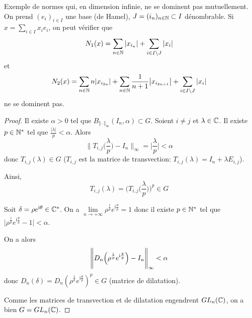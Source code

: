 \begin{remark}
	Exemple de normes qui, en dimension infinie, ne se dominent pas mutuellement. On prend $(e_{i})_{i\in I}$ une base (de Hamel), $J=(i_{n})_{n\in\mathbb{N}}\subset I$ dénombrable. Si $x=\sum_{i\in I}x_{i}e_{i}$, on peut vérifier que 
	\begin{equation}N_{1}(x)=\sum_{n\in\mathbb{N}}\vert x_{i_{n}}\vert+\sum_{i\in I\setminus J}\vert x_{i}\vert\end{equation}
	et
	\begin{equation}N_{2}(x)=\sum_{n\in\mathbb{N}}n\vert x_{i_{2n}}\vert+\sum_{n\in\mathbb{N}}\frac{1}{n+1}\bigl\lvert x_{i_{2n+1}}\bigr\rvert+\sum_{i\in I\setminus J}\vert x_{i}\vert\end{equation}
	ne se dominent pas.
\end{remark}

\begin{proof}
	Il existe $\alpha>0$ tel que $B_{\Vert\cdot\Vert_{\infty}}(I_{n},\alpha)\subset G$. Soient $i\neq j$ et $\lambda\in\mathbb{C}$. Il existe $p\in\mathbb{N}^{*}$ tel que $\frac{\vert\lambda\vert}{p}<\alpha$. Alors 
	\begin{equation}\Biggl\lVert T_{i,j}\Biggl(\frac{\lambda}{p}\Biggr)-I_{n}\Biggr\rVert_{\infty}=\Biggl\lvert\frac{\lambda}{p}\Biggr\rvert<\alpha\end{equation}
	donc $T_{i,j}(\lambda)\in G$ ($T_{i,j}$ est la matrice de transvection: $T_{i,j}(\lambda)=I_{n}+\lambda E_{i,j}$).

	Ainsi,
	\begin{equation}T_{i,j}(\lambda)=\Biggl(T_{i,j}\Biggl(\frac{\lambda}{p}\Biggr)\Biggr)^{p}\in G\end{equation}

	Soit $\delta=\rho e^{\mathrm{i}\theta}\in\mathbb{C}^{*}$. On a $\lim\limits_{n\to+\infty}\rho^{\frac{1}{p}}e^{\mathrm{i}\frac{\theta}{p}}=1$ donc il existe $p\in\mathbb{N}^{*}$ tel que $\vert\rho^{\frac{1}{p}}e^{\mathrm{i}\frac{\theta}{p}}-1\vert<\alpha$.
	
	On a alors
	\begin{equation}\Biggl\lVert D_{n}\Bigl(\rho^{\frac{1}{p}}e^{\mathrm{i}\frac{\theta}{p}}\Bigr)-I_{n}\Biggr\rVert_{\infty}<\alpha\end{equation}
	donc $D_{n}(\delta)=D_{n}(\rho^{\frac{1}{p}}e^{\mathrm{i}\frac{\theta}{p}})^{p}\in G$ (matrice de dilatation).

	Comme les matrices de transvection et de dilatation engendrent $GL_{n}(\mathbb{C})$, on a bien $G=GL_{n}(\mathbb{C})$.
\end{proof}

